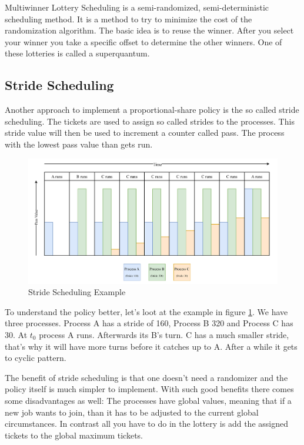 Multiwinner Lottery Scheduling is a semi-randomized, semi-deterministic scheduling method.
It is a method to try to minimize the cost of the randomization algorithm.
The basic idea is to reuse the winner.
After you select your winner you take a specific offset to determine the other winners.
One of these lotteries is called a superquantum.

\subsection{Stride Scheduling}

Another approach to implement a proportional-share policy is the so called stride scheduling.
The tickets are used to assign so called strides to the processes.
This stride value will then be used to increment a counter called pass.
The process with the lowest pass value than gets run.

\begin{figure}[h]
    \centering
    \includegraphics[width=\textwidth]{Assets/Stride-Scheduling.pdf}
    \caption{Stride Scheduling Example}
    \label{fig:stride-scheduling}
\end{figure}

To understand the policy better, let's loot at the example in figure \ref{fig:stride-scheduling}.
We have three processes. Process A has a stride of 160, Process B 320 and Process C has 30. At $t_0$ process A runs. Afterwards its B's turn. C has a much smaller stride, that's why it will have more turns before it catches up to A.
After a while it gets to cyclic pattern.


The benefit of stride scheduling is that one doesn't need a randomizer and the policy itself is much simpler to implement. With such good benefits there comes some disadvantages as well: The processes have global values, meaning that if a new job wants to join, than it has to be adjusted to the current global circumstances. In contrast all you have to do in the lottery is add the assigned tickets to the global maximum tickets.

